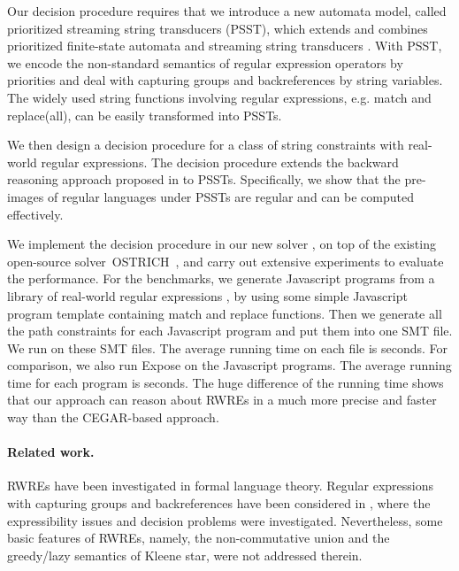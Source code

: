 Our decision procedure requires that we introduce a new automata model, called 
prioritized streaming string transducers (PSST), which extends and combines 
prioritized finite-state automata \cite{BM17} and streaming string transducers 
\cite{AC10,AD11}. With PSST, we encode the non-standard semantics of regular 
expression operators by priorities and deal with capturing groups and backreferences by string variables. 
The widely used string functions involving regular expressions, e.g. match and replace(all), can be easily transformed into PSSTs. 

We then design a decision procedure for a class of string constraints with real-world regular expressions. The decision procedure extends the backward reasoning approach proposed in \cite{CHL+19} to PSSTs. Specifically, we show that the pre-images of regular languages under PSSTs are regular and can be computed effectively. 

We implement the decision procedure in our new solver \ostrich,
on top of the existing open-source solver~OSTRICH~\cite{CHL+19},
 and carry out extensive experiments to evaluate the performance. For the benchmarks, we generate  Javascript programs from a library of real-world regular expressions \cite{DMC+19}, by using some simple Javascript program template containing match and replace functions.  Then we generate all the path constraints for each Javascript program and put them into one SMT file. We run {\ostrich} on these SMT files. The average running time on each file is  seconds. For comparison, we also run Expose on the Javascript programs. The average running time for each program is  seconds. The huge difference of the running time shows that our approach can reason about RWREs in a much more precise and faster way than the CEGAR-based approach.


\paragraph*{Related work.}

RWREs have been investigated in formal language theory. Regular expressions with capturing groups and backreferences have been considered in \cite{CSY03,CN09,Freydenberger13,Schmid16,FS19}, where the expressibility issues and decision problems were investigated. Nevertheless, some basic features of RWREs, namely, the non-commutative union and the greedy/lazy semantics of Kleene star, were not addressed therein.


